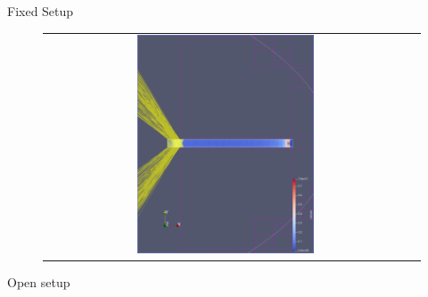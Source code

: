 \documentclass[aspectratio=43,t]{beamer}
\begin{document}
\begin{frame}[fragile]{Fixed Setup}
\begin{figure}
{\begin{tabular}{c c}
            \includegraphics[width=0.5\textwidth]{images/fixed_rand/4.png} \\
        \end{tabular}
		}
    \end{figure}
    \end{frame}

	\begin{frame}[fragile]{Open setup}
	\begin{figure}
        \centering
    \end{figure}
    \end{frame}
\end{document}
